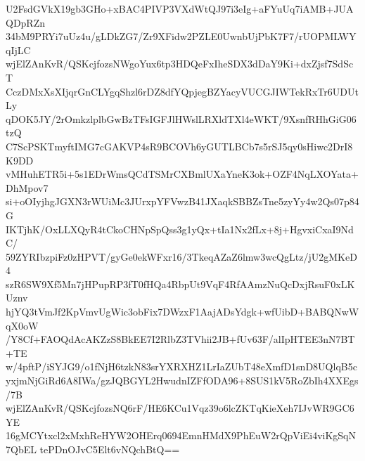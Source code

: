 U2FsdGVkX19gb3GHo+xBAC4PIVP3VXdWtQJ97i3eIg+aFYuUq7iAMB+JUAQDpRZn
34bM9PRYi7uUz4u/gLDkZG7/Zr9XFidw2PZLE0UwnbUjPbK7F7/rUOPMLWYqIjLC
wjElZAnKvR/QSKcjfozsNWgoYux6tp3HDQeFxIheSDX3dDaY9Ki+dxZjsf7SdScT
CczDMxXsXIjqrGnCLYgqShzl6rDZ8dfYQpjegBZYacyVUCGJIWTekRxTr6UDUtLy
qDOK5JY/2rOmkzlplbGwBzTFsIGFJlHWslLRXldTXl4eWKT/9XsnfRHhGiG06tzQ
C7ScPSKTmyftIMG7cGAKVP4sR9BCOVh6yGUTLBCb7s5rSJ5qy0sHiwc2DrI8K9DD
vMHuhETR5i+5s1EDrWmsQCdTSMrCXBmlUXaYneK3ok+OZF4NqLXOYata+DhMpov7
si+oOIyjhgJGXN3rWUiMc3JUrxpYFVwzB41JXaqkSBBZsTne5zyYy4w2Qs07p84G
IKTjhK/OxLLXQyR4tCkoCHNpSpQss3g1yQx+tIa1Nx2fLx+8j+HgvxiCxaI9NdC/
59ZYRIbzpiFz0zHPVT/gyGe0ekWFxr16/3TkeqAZaZ6lmw3wcQgLtz/jU2gMKeD4
szR6SW9Xf5Mn7jHPupRP3fT0fHQa4RbpUt9VqF4RfAAmzNuQcDxjRsuF0xLKUznv
hjYQ3tVmJf2KpVmvUgWic3obFix7DWzxF1AajADsYdgk+wfUibD+BABQNwWqX0oW
/Y8Cf+FAOQdAcAKZzS8BkEE7I2RlbZ3TVhii2JB+fUv63F/alIpHTEE3nN7BT+TE
w/4pftP/iSYJG9/o1fNjH6tzkN83srYXRXHZ1LrIaZUbT48eXmfD1snD8UQlqB5c
yxjmNjGiRd6A8IWa/gzJQBGYL2HwudnIZFfODA96+8SUS1kV5RoZbIh4XXEgs/7B
wjElZAnKvR/QSKcjfozsNQ6rF/HE6KCu1Vqz39o6lcZKTqKieXeh7IJvWR9GC6YE
16gMCYtxcl2xMxhReHYW2OHErq0694EmnHMdX9PhEuW2rQpViEi4viKgSqN7QbEL
tePDnOJvC5Elt6vNQchBtQ==
